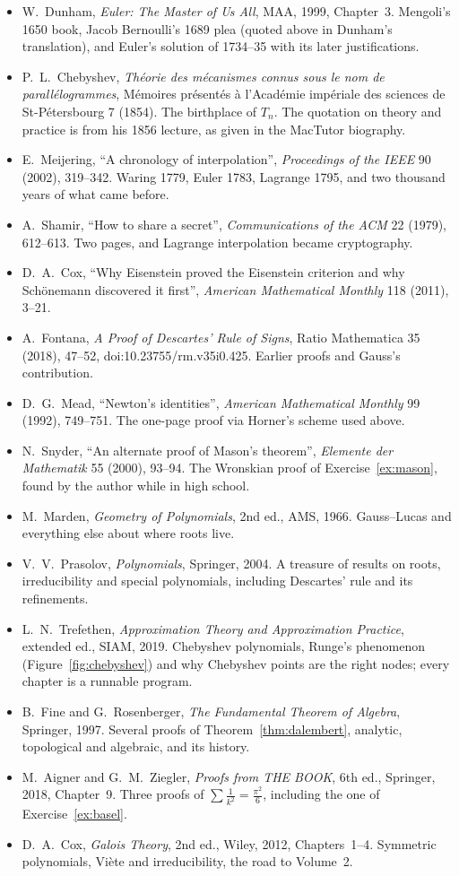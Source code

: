 \begin{itemize}\raggedright
\item W.~Dunham, \emph{Euler: The Master of Us All}, MAA, 1999, Chapter~3. Mengoli's 1650 book, Jacob Bernoulli's 1689 plea (quoted above in Dunham's translation), and Euler's solution of 1734--35 with its later justifications.
\item P.~L.~Chebyshev, \emph{Th\'eorie des m\'ecanismes connus sous le nom de parall\'elogrammes}, M\'emoires pr\'esent\'es \`a l'Acad\'emie imp\'eriale des sciences de St-P\'etersbourg 7 (1854). The birthplace of $T_n$. The quotation on theory and practice is from his 1856 lecture, as given in the MacTutor biography.
\item E.~Meijering, ``A chronology of interpolation'', \emph{Proceedings of the IEEE} 90 (2002), 319--342. Waring 1779, Euler 1783, Lagrange 1795, and two thousand years of what came before.
\item A.~Shamir, ``How to share a secret'', \emph{Communications of the ACM} 22 (1979), 612--613. Two pages, and Lagrange interpolation became cryptography.
\item D.~A.~Cox, ``Why Eisenstein proved the Eisenstein criterion and why Sch\"onemann discovered it first'', \emph{American Mathematical Monthly} 118 (2011), 3--21.
\item A.~Fontana, \emph{A Proof of Descartes' Rule of Signs}, Ratio Mathematica 35 (2018), 47--52, doi:10.23755/rm.v35i0.425. Earlier proofs and Gauss's contribution.
\item D.~G.~Mead, ``Newton's identities'', \emph{American Mathematical Monthly} 99 (1992), 749--751. The one-page proof via Horner's scheme used above.
\item N.~Snyder, ``An alternate proof of Mason's theorem'', \emph{Elemente der Mathematik} 55 (2000), 93--94. The Wronskian proof of Exercise~\ref{ex:mason}, found by the author while in high school.
\item M.~Marden, \emph{Geometry of Polynomials}, 2nd ed., AMS, 1966. Gauss--Lucas and everything else about where roots live.
\item V.~V.~Prasolov, \emph{Polynomials}, Springer, 2004. A treasure of results on roots, irreducibility and special polynomials, including Descartes' rule and its refinements.
\item L.~N.~Trefethen, \emph{Approximation Theory and Approximation Practice}, extended ed., SIAM, 2019. Chebyshev polynomials, Runge's phenomenon (Figure~\ref{fig:chebyshev}) and why Chebyshev points are the right nodes; every chapter is a runnable program.
\item B.~Fine and G.~Rosenberger, \emph{The Fundamental Theorem of Algebra}, Springer, 1997. Several proofs of Theorem~\ref{thm:dalembert}, analytic, topological and algebraic, and its history.
\item M.~Aigner and G.~M.~Ziegler, \emph{Proofs from THE BOOK}, 6th ed., Springer, 2018, Chapter~9. Three proofs of $\sum\frac1{k^2}=\frac{\pi^2}6$, including the one of Exercise~\ref{ex:basel}.
\item D.~A.~Cox, \emph{Galois Theory}, 2nd ed., Wiley, 2012, Chapters~1--4. Symmetric polynomials, Vi\`ete and irreducibility, the road to Volume~2.
\end{itemize}
